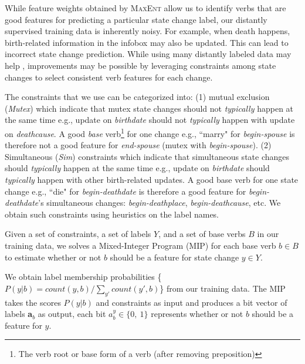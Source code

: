 While feature weights obtained by \textsc{MaxEnt} allow us to identify verbs that are good features for predicting a particular state change label, our distantly supervised training data is inherently noisy. %
For example, when death happens, birth-related information in the infobox may also be updated. This can lead to incorrect state change prediction. While using many distantly labeled data may help%
, improvements may be possible by leveraging constraints among state changes to select consistent verb features for each change. 

The constraints that we use can be categorized into: (1) mutual exclusion (\textit{Mutex}) which indicate that mutex state changes should not \textit{typically} happen at the same time e.g., update on \textit{birthdate} should not \textit{typically} happen with update on \textit{deathcause}. %
A good \textit{base} verb\footnote[3]{The verb root or base form of a verb (after removing preposition)} for one change e.g., ``marry" for \textit{begin-spouse} is therefore not a good feature for \textit{end-spouse} (mutex with \textit{begin-spouse}). (2) Simultaneous (\textit{Sim}) constraints which indicate that simultaneous state changes should \textit{typically} happen at the same time e.g., update on \textit{birthdate} should \textit{typically} happen with other birth-related updates. %
A good base verb for one state change e.g., ``die" for \textit{begin-deathdate} is therefore a good feature for \textit{begin-deathdate}'s simultaneous changes: \textit{begin-deathplace}, \textit{begin-deathcause}, etc. We obtain such constraints using heuristics on the label names.%

Given a set of constraints, a set of labels $Y$, and a set of base verbs $B$ in our training data, we solves a Mixed-Integer Program (MIP) for each base verb $b \in B$ to estimate whether or not $b$ should be a feature for state change $y \in Y$. 

We obtain label membership probabilities \{$P(y | b) = count(y, b) / \sum_{y'} count(y', b) $\} from our training data. The MIP takes the scores $P(y | b)$ and constraints as input and produces a bit vector of labels \textbf{a}$_{b}$ as output, each bit  $a_{b}^{y} \in \{0,\ 1\}$ represents whether or not $b$ should be a feature for $y$.

